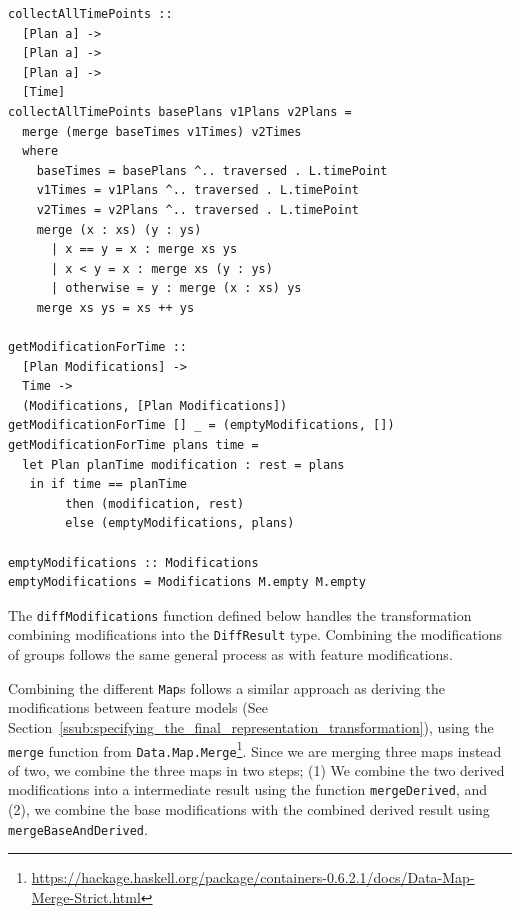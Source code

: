 \documentclass[a4paper,english]{ifimaster}
\begin{document}
\begin{verbatim}
collectAllTimePoints ::
  [Plan a] ->
  [Plan a] ->
  [Plan a] ->
  [Time]
collectAllTimePoints basePlans v1Plans v2Plans =
  merge (merge baseTimes v1Times) v2Times
  where
    baseTimes = basePlans ^.. traversed . L.timePoint
    v1Times = v1Plans ^.. traversed . L.timePoint
    v2Times = v2Plans ^.. traversed . L.timePoint
    merge (x : xs) (y : ys)
      | x == y = x : merge xs ys
      | x < y = x : merge xs (y : ys)
      | otherwise = y : merge (x : xs) ys
    merge xs ys = xs ++ ys

getModificationForTime ::
  [Plan Modifications] ->
  Time ->
  (Modifications, [Plan Modifications])
getModificationForTime [] _ = (emptyModifications, [])
getModificationForTime plans time =
  let Plan planTime modification : rest = plans
   in if time == planTime
        then (modification, rest)
        else (emptyModifications, plans)

emptyModifications :: Modifications
emptyModifications = Modifications M.empty M.empty
\end{verbatim}

The \texttt{diff\-Modifications} function defined below handles the transformation combining modifications into the \texttt{DiffResult} type. Combining the modifications of groups follows the same general process as with feature modifications. 

Combining the different \texttt{Map}s follows a similar approach as deriving the modifications between feature models (See Section~\vref{ssub:specifying_the_final_representation_transformation}), using the \texttt{merge} function from \texttt{Data.Map.Merge}\footnote{\url{https://hackage.haskell.org/package/containers-0.6.2.1/docs/Data-Map-Merge-Strict.html}}. Since we are merging three maps instead of two, we combine the three maps in two steps; (1) We combine the two derived modifications into a intermediate result using the function \texttt{mergeDerived}, and (2), we combine the base modifications with the combined derived result using \texttt{merge\-Base\-And\-Derived}.
\end{document}
